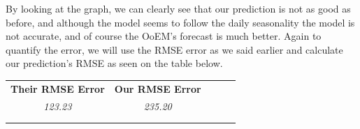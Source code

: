 By looking at the graph, we can clearly see that our prediction is not as good as before, and although the model seems to follow the daily seasonality the model is not accurate, and of course the OoEM's forecast is much better. Again to quantify the error, we will use the RMSE error as we said earlier and calculate our prediction's RMSE as seen on the table below.
\begin{table}[h!]
\centering
\begin{tabular}{lllll}
\cline{1-2}
\multicolumn{1}{|l|}{\textbf{Their RMSE Error}} & \multicolumn{1}{l|}{\textbf{Our RMSE Error}} &  &  &  \\ \cline{1-2}
\multicolumn{1}{|c|}{\textit{123.23}} & \multicolumn{1}{c|}{\textit{235.20}} &  &  &  \\ \cline{1-2}
                                &                                &  &  &  \\
                                &                                &  &  & 
\end{tabular}
\end{table}
\newpage
